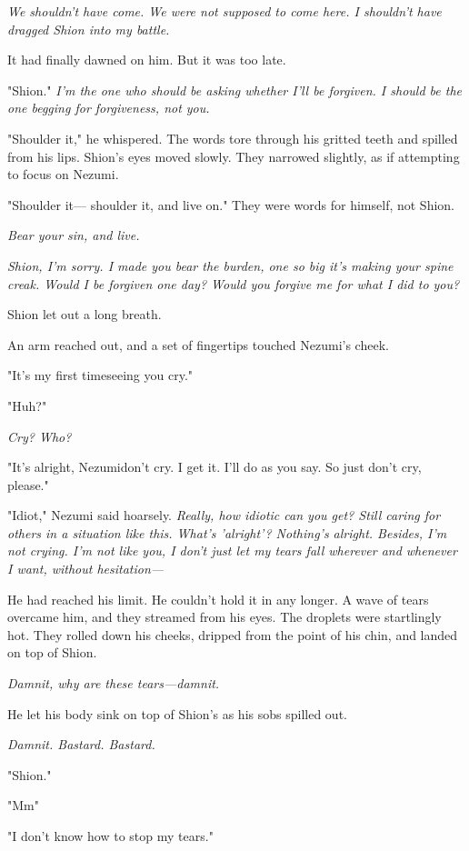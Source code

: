 \emph{We shouldn't have come. We were not supposed to come here. I shouldn't
have dragged Shion into my battle.}

It had finally dawned on him. But it was too late.

"Shion." \emph{I'm the one who should be asking whether I'll be forgiven. I
should be the one begging for forgiveness, not you.}

"Shoulder it," he whispered. The words tore through his gritted teeth
and spilled from his lips. Shion's eyes moved slowly. They narrowed
slightly, as if attempting to focus on Nezumi.

"Shoulder it--- shoulder it, and live on." They were words for himself,
not Shion.

\emph{Bear your sin, and live.}

\emph{Shion, I'm sorry. I made you bear the burden, one so big it's making
your spine creak. Would I be forgiven one day? Would you forgive me for
what I did to you?}

Shion let out a long breath.

An arm reached out, and a set of fingertips touched Nezumi's cheek.

"It's my first time\el seeing you cry."

"Huh?"

\emph{Cry? Who?}

"It's alright, Nezumi\el don't cry. I get it. I'll do as you say. So
just don't cry, please."

"Idiot," Nezumi said hoarsely. \emph{Really, how idiotic can you get? Still
caring for others in a situation like this. What's 'alright'? Nothing's
alright. Besides, I'm not crying. I'm not like you, I don't just let my
tears fall wherever and whenever I want, without hesitation---}

He had reached his limit. He couldn't hold it in any longer. A wave of
tears overcame him, and they streamed from his eyes. The droplets were
startlingly hot. They rolled down his cheeks, dripped from the point of
his chin, and landed on top of Shion.

\emph{Damnit, why are these tears---damnit.}

He let his body sink on top of Shion's as his sobs spilled out.

\emph{Damnit. Bastard. Bastard.}

"Shion."

"Mm\el "

"I don't know how to stop my tears."

